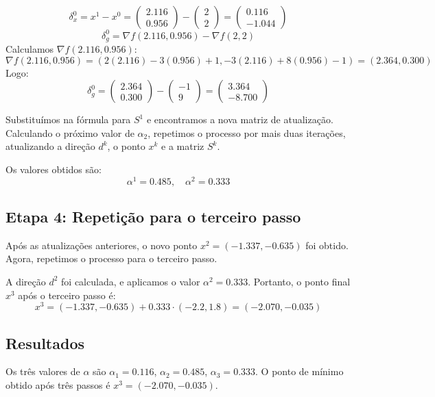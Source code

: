 \documentclass[a4paper, 12pt]{article}
\begin{document}
\[
\delta_x^0 = x^1 - x^0 = \begin{pmatrix} 2.116 \\ 0.956 \end{pmatrix} - \begin{pmatrix} 2 \\ 2 \end{pmatrix} = \begin{pmatrix} 0.116 \\ -1.044 \end{pmatrix}
\]
\[
\delta_g^0 = \nabla f(2.116, 0.956) - \nabla f(2, 2)
\]
Calculamos \( \nabla f(2.116, 0.956) \):
\[
\nabla f(2.116, 0.956) = \left( 2(2.116) - 3(0.956) + 1, -3(2.116) + 8(0.956) - 1 \right) = (2.364, 0.300)
\]
Logo:
\[
\delta_g^0 = \begin{pmatrix} 2.364 \\ 0.300 \end{pmatrix} - \begin{pmatrix} -1 \\ 9 \end{pmatrix} = \begin{pmatrix} 3.364 \\ -8.700 \end{pmatrix}
\]

Substituímos na fórmula para \( S^1 \) e encontramos a nova matriz de atualização. Calculando o próximo valor de \( \alpha_2 \), repetimos o processo por mais duas iterações, atualizando a direção \( d^k \), o ponto \( x^k \) e a matriz \( S^k \).

Os valores obtidos são:
\[
\alpha^1 = 0.485, \quad \alpha^2 = 0.333
\]

\subsection{Etapa 4: Repetição para o terceiro passo}
Após as atualizações anteriores, o novo ponto \( x^2 = (-1.337, -0.635) \) foi obtido. Agora, repetimos o processo para o terceiro passo.

A direção \( d^2 \) foi calculada, e aplicamos o valor \( \alpha^2 = 0.333 \). Portanto, o ponto final \( x^3 \) após o terceiro passo é:
\[
x^3 = (-1.337, -0.635) + 0.333 \cdot (-2.2, 1.8) = (-2.070, -0.035)
\]

\subsection{Resultados}
Os três valores de \( \alpha \) são \( \alpha_1 = 0.116 \), \( \alpha_2 = 0.485 \), \( \alpha_3 = 0.333 \). O ponto de mínimo obtido após três passos é \( x^3 = (-2.070, -0.035) \).
\end{document}
